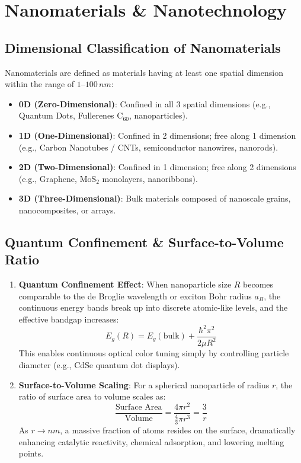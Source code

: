 \section{Nanomaterials \& Nanotechnology}

\subsection{Dimensional Classification of Nanomaterials}
Nanomaterials are defined as materials having at least one spatial dimension within the range of $1\text{--}100\,\si{nm}$:
\begin{itemize}
    \item \textbf{0D (Zero-Dimensional)}: Confined in all 3 spatial dimensions (e.g., Quantum Dots, Fullerenes $\text{C}_{60}$, nanoparticles).
    \item \textbf{1D (One-Dimensional)}: Confined in 2 dimensions; free along 1 dimension (e.g., Carbon Nanotubes / CNTs, semiconductor nanowires, nanorods).
    \item \textbf{2D (Two-Dimensional)}: Confined in 1 dimension; free along 2 dimensions (e.g., Graphene, $\text{MoS}_2$ monolayers, nanoribbons).
    \item \textbf{3D (Three-Dimensional)}: Bulk materials composed of nanoscale grains, nanocomposites, or arrays.
\end{itemize}

\subsection{Quantum Confinement \& Surface-to-Volume Ratio}
\begin{enumerate}
    \item \textbf{Quantum Confinement Effect}: When nanoparticle size $R$ becomes comparable to the de Broglie wavelength or exciton Bohr radius $a_B$, the continuous energy bands break up into discrete atomic-like levels, and the effective bandgap increases:
    \begin{equation}
        E_g(R) = E_g(\text{bulk}) + \frac{\hbar^2\pi^2}{2\mu R^2}
    \end{equation}
    This enables continuous optical color tuning simply by controlling particle diameter (e.g., CdSe quantum dot displays).
    \item \textbf{Surface-to-Volume Scaling}: For a spherical nanoparticle of radius $r$, the ratio of surface area to volume scales as:
    \begin{equation}
        \frac{\text{Surface Area}}{\text{Volume}} = \frac{4\pi r^2}{\frac{4}{3}\pi r^3} = \frac{3}{r}
    \end{equation}
    As $r \to \si{nm}$, a massive fraction of atoms resides on the surface, dramatically enhancing catalytic reactivity, chemical adsorption, and lowering melting points.
\end{enumerate}

